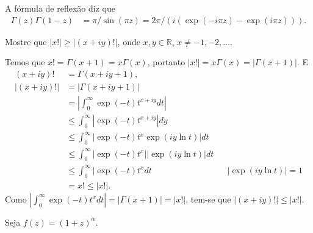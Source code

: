 \documentclass[a4paper,12pt, leqno, answers]{exam}
\begin{document}
\begin{questions}
\begin{solution}
        A f\'{o}rmula de reflex\~{a}o diz que
        \begin{align*}
            \Gamma(z) \Gamma(1 -z) &= \pi / \sin(\pi z) = 2 \pi / \left( i (\exp(-i \pi z) - \exp(i \pi z)) \right).
        \end{align*}
    \end{solution}

    \question Mostre que $|x!| \geq |\left( x + iy \right)!|$, onde $x, y \in \mathbb{R}$, $x \neq -1, -2, \ldots$.
    \begin{solution}
        Temos que $x! = \Gamma(x + 1) = x \Gamma(x)$, portanto $| x! | = x \Gamma(x) = | \Gamma(x + 1) |$. E
        \begin{align*}
            (x + i y)! &= \Gamma(x + i y + 1), \\
            | (x + i y)! | &= | \Gamma(x + i y + 1) | \\
            &= \left| \int_0^\infty \exp(-t) t^{x + iy} dt \right| \\
            &\leq \int_0^\infty | \exp(-t) t^{x + i y} | dy \\
            &\leq \int_0^\infty | \exp(-t) t^x \exp(i y \ln t) | dt \\
            &\leq \int_0^\infty | \exp(-t) t^x | | \exp(i y \ln t) | dt \\
            &\leq \int_0^\infty | \exp(-t) t^x dt && | \exp(i y \ln t) | = 1 \\
            &= x! \leq | x! |.
        \end{align*}
        Como $| \int_0^\infty \exp(-t) t^x dt | = | \Gamma(x + 1) | = | x! |$, tem-se que $ | (x + i y)! | \leq | x! |$.
    \end{solution}

    \question Seja $f(z) = \left( 1 + z \right)^\alpha$.
    \begin{parts}

\end{parts}
\end{questions}
\end{document}

